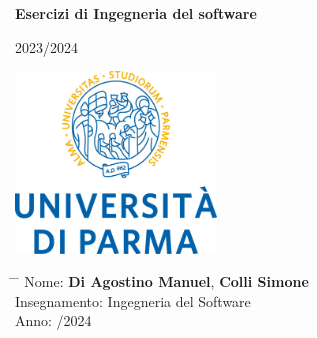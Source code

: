 \documentclass[12pt,a4paper]{article}
\title{}
\author{}
\date{}
\begin{document}
	
	\newcommand{\subf}[2]{%
		{\small\begin{tabular}[t]{@{}c@{}}
				#1\\#2
		\end{tabular}}%
	}
	
	\begin{titlepage}
		\begin{center}
			\vspace*{3cm}
			
			\Huge
			\textbf{Esercizi di Ingegneria del software}
			
			\vspace{0.3cm}
			\Huge
			2023/2024
			
			\vspace{0.8cm}
			\large
			
			
			
			\vspace{0.5cm}
			\LARGE
			
			
			\vspace{1.5cm}
			
			\textbf{}
            \includegraphics[width=0.4\textwidth]{images/uniprLogo.jpg}
			
			\vfill
			
			
			
			\vspace{0.8cm}
			
			
			
			\Large
			
			
			
			
		\end{center}
		\Large
		\begin{tabbing}
			\hspace*{1em}\= \hspace*{8em} \= \kill %
			\> Nome:\>  \textbf{Di Agostino Manuel}, \textbf{Colli Simone} \\
			\> Insegnamento:\>  Ingegneria del Software  \\
			\> Anno:  \> 2023/2024
		\end{tabbing}
		
	\end{titlepage}
\end{document}
